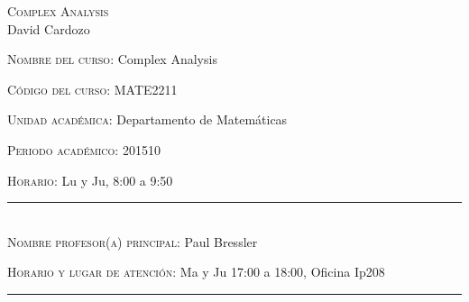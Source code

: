 \begin{center}
\textsc{\large Complex Analysis }\\[0.1cm]
\large David Cardozo\\[0.5cm]
\end{center}	

\large \noindent\textsc{Nombre del curso:}  Complex Analysis%

\noindent\textsc{Código del curso:} MATE2211 %

\noindent\textsc{Unidad académica:} Departamento de Matemáticas

\noindent\textsc{Periodo acad\'emico:} 201510 %

\noindent\textsc{Horario:} Lu y Ju, 8:00 a 9:50%

\noindent\rule{\textwidth}{1pt}\\[-0.3cm]

\normalsize \noindent\textsc{Nombre profesor(a) principal:} Paul Bressler%


\noindent\textsc{Horario y lugar de atenci\'on:} Ma y Ju 17:00 a
18:00, Oficina Ip208

\noindent\rule{\textwidth}{1pt}\\[-0.1cm]